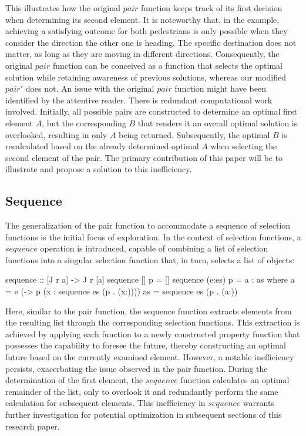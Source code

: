 \documentclass[runningheads]{llncs}
\begin{document}
This illustrates how the original \(pair\) function keeps track of its
first decision when determining its second element. It is noteworthy
that, in the example, achieving a satisfying outcome for both
pedestrians is only possible when they consider the direction the other
one is heading. The specific destination does not matter, as long as
they are moving in different directions. Consequently, the original
\(pair\) function can be conceived as a function that selects the
optimal solution while retaining awareness of previous solutions,
whereas our modified \(pair'\) does not. An issue with the original
\(pair\) function might have been identified by the attentive reader.
There is redundant computational work involved. Initially, all possible
pairs are constructed to determine an optimal first element \(A\), but
the corresponding \(B\) that renders it an overall optimal solution is
overlooked, resulting in only \(A\) being returned. Subsequently, the
optimal \(B\) is recalculated based on the already determined optimal
\(A\) when selecting the second element of the pair. The primary
contribution of this paper will be to illustrate and propose a solution
to this inefficiency.

\subsection{Sequence}\label{sequence}

The generalization of the pair function to accommodate a sequence of
selection functions is the initial focus of exploration. In the context
of selection functions, a \(sequence\) operation is introduced, capable
of combining a list of selection functions into a singular selection
function that, in turn, selects a list of objects:

\begin{code}
sequence :: [J r a] -> J r [a]
sequence [] p     = []
sequence (e:es) p = a : as
  where 
      a  = e (\x -> p (x : sequence es (p . (x:))))
      as = sequence es (p . (a:))
\end{code}

Here, similar to the pair function, the sequence function extracts
elements from the resulting list through the corresponding selection
functions. This extraction is achieved by applying each function to a
newly constructed property function that possesses the capability to
foresee the future, thereby constructing an optimal future based on the
currently examined element. However, a notable inefficiency persists,
exacerbating the issue observed in the pair function. During the
determination of the first element, the \(sequence\) function calculates
an optimal remainder of the list, only to overlook it and redundantly
perform the same calculation for subsequent elements. This inefficiency
in \(sequence\) warrants further investigation for potential
optimization in subsequent sections of this research paper.
\end{document}
